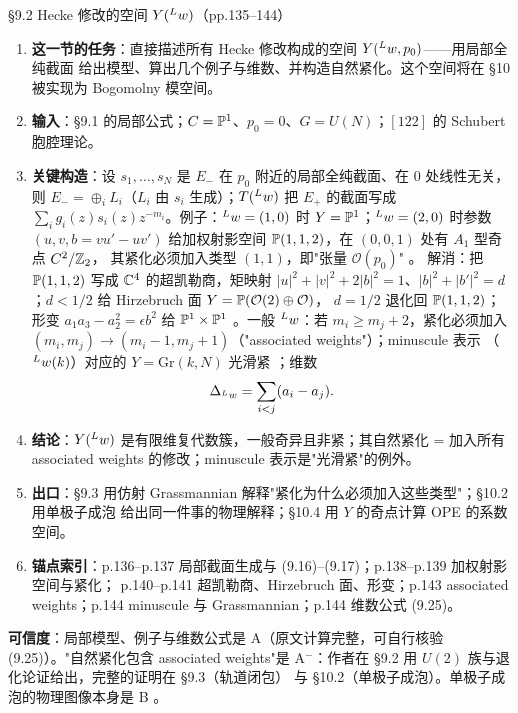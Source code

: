 \begin{kcard}{\S9.2 Hecke 修改的空间 $Y({}^{L}w)$（pp.135--144）}
\begin{enumerate}[label=\textbf{\arabic*}]
\item \textbf{这一节的任务}：直接描述所有 Hecke 修改构成的空间 $Y({}^{L}w,p_0)$——用局部全纯截面
  给出模型、算出几个例子与维数、并构造自然紧化。这个空间将在 \S10 被实现为 Bogomolny 模空间。
\item \textbf{输入}：\S9.1 的局部公式；$C=\mathbb{P}^1$、$p_0=0$、$G=U(N)$；$[122]$ 的 Schubert 胞腔理论。
\item \textbf{关键构造}：设 $s_1,\dots,s_N$ 是 $E_-$ 在 $p_0$ 附近的局部全纯截面、在 $0$ 处线性无关，
  则 $E_-=\oplus_iL_i$（$L_i$ 由 $s_i$ 生成）；$T({}^{L}w)$ 把 $E_+$ 的截面写成
  $\sum_i g_i(z)s_i(z)z^{-m_i}$。例子：${}^{L}w=(1,0)$ 时 $Y=\mathbb{P}^1$；${}^{L}w=(2,0)$ 时参数
  $(u,v,b=vu'-uv')$ 给加权射影空间 $\mathbb{P}(1,1,2)$，在 $(0,0,1)$ 处有 $A_1$ 型奇点 $C^2/\mathbb{Z}_2$，
  其紧化必须加入类型 $(1,1)$，即"张量 $\mathcal O(p_0)$" \pA{}。
  解消：把 $\mathbb{P}(1,1,2)$ 写成 $\mathbb{C}^4$ 的超凯勒商，矩映射
  $|u|^2+|v|^2+2|b|^2=1$、$|b|^2+|b'|^2=d$；$d<1/2$ 给 Hirzebruch 面 $Y=\mathbb{P}(\mathcal O(2)\oplus\mathcal O)$，
  $d=1/2$ 退化回 $\mathbb{P}(1,1,2)$；形变 $a_1a_3-a_2^2=\epsilon b^2$ 给 $\mathbb{P}^1\times\mathbb{P}^1$
  \pA{}。一般 ${}^{L}w$：若 $m_i\ge m_j+2$，紧化必须加入
  $(m_i,m_j)\to(m_i-1,m_j+1)$（"associated weights"）\pA{}；minuscule 表示
  （${}^{L}w(k)$）对应的 $Y=\mathrm{Gr}(k,N)$ 光滑紧 \pA{}；维数
\begin{equation}
\Delta_{{}^{L}w}=\sum_{i<j}(a_i-a_j).
\label{eq:geom-hecke-dim}
\end{equation}
\item \textbf{结论}：$Y({}^{L}w)$ 是有限维复代数簇，一般奇异且非紧；其自然紧化 = 加入所有
  associated weights 的修改；minuscule 表示是"光滑紧"的例外。
\item \textbf{出口}：\S9.3 用仿射 Grassmannian 解释"紧化为什么必须加入这些类型"；\S10.2 用单极子成泡
  给出同一件事的物理解释；\S10.4 用 $Y$ 的奇点计算 OPE 的系数空间。
\item \textbf{锚点索引}：p.136--p.137 局部截面生成与 (9.16)--(9.17)；p.138--p.139 加权射影空间与紧化；
  p.140--p.141 超凯勒商、Hirzebruch 面、形变；p.143 associated weights；p.144 minuscule 与
  Grassmannian；p.144 维数公式 (9.25)。
\end{enumerate}
\textbf{可信度}：局部模型、例子与维数公式是 A（原文计算完整，可自行核验 (9.25)）。"自然紧化包含
associated weights"是 A$^-$：作者在 \S9.2 用 $U(2)$ 族与退化论证给出，完整的证明在 \S9.3（轨道闭包）
与 \S10.2（单极子成泡）\pA{}。单极子成泡的物理图像本身是 B \pB{}。
\end{kcard}

